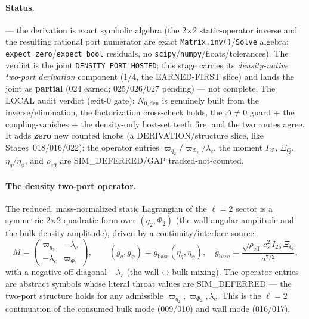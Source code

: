 \paragraph{Status.}
\StatusExactClosure{} --- the derivation is exact symbolic algebra (the 2\(\times\)2
static-operator inverse and the resulting rational port numerator are exact
\texttt{Matrix.inv()}/\texttt{Solve} algebra; \texttt{expect\_zero}/\texttt{expect\_bool}
residuals, no \texttt{scipy}/\texttt{numpy}/floats/tolerances). The verdict is the joint
\texttt{DENSITY\_PORT\_HOSTED}; this stage carries its \emph{density-native two-port
derivation} component (1/4, the EARNED-FIRST slice) and lands the joint as \textbf{partial}
(024 earned; 025/026/027 pending) --- not complete. 
The LOCAL audit verdict (exit-0 gate): \(N_{0,\mathrm{den}}\) is genuinely built from the
inverse/elimination, the factorization cross-check holds, the \(\Delta\ne0\) guard + the
coupling-vanishes + the density-only host-set teeth fire, and the two routes agree. It adds
\textbf{zero} new counted knobs (a DERIVATION/structure slice, like Stages~018/016/022); the
operator entries \(\varpi_{q_2}/\varpi_{\Phi_2}/\lambda_c\), the moment \(I_{25}\), \(\Xi_Q\),
\(\eta_{q}/\eta_{\phi}\), and \(\rho_{\mathrm{eff}}\) are SIM\_DEFERRED/GAP tracked-not-counted.

\paragraph{The density two-port operator.}
The reduced, mass-normalized static Lagrangian of the \(\ell=2\) sector is a symmetric 2\(\times\)2
quadratic form over \((q_2,\Phi_2)\) (the wall angular amplitude and the bulk-density amplitude),
driven by a continuity/interface source:
\[
  M=\begin{pmatrix}\varpi_{q_2} & -\lambda_c\\ -\lambda_c & \varpi_{\Phi_2}\end{pmatrix},
  \qquad
  (g_q,g_\phi)=g_{\mathrm{base}}(\eta_q,\eta_\phi),
  \quad
  g_{\mathrm{base}}=\frac{\sqrt{\rho_{\mathrm{eff}}}\,c_s^2\,I_{25}\,\Xi_Q}{a^{7/2}},
\]
with a negative off-diagonal \(-\lambda_c\) (the wall\(\leftrightarrow\)bulk mixing). The operator
entries are abstract symbols whose literal throat values are SIM\_DEFERRED --- the two-port
structure holds for any admissible \(\varpi_{q_2},\varpi_{\Phi_2},\lambda_c\). This is the
\(\ell=2\) continuation of the consumed bulk mode (009/010) and wall mode (016/017).

